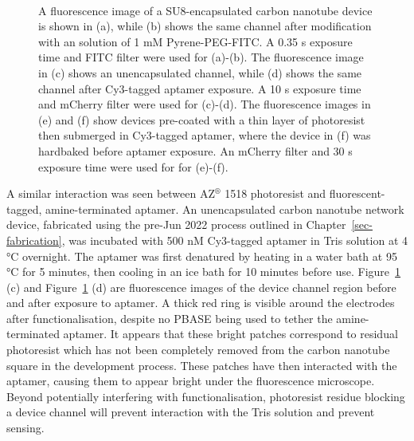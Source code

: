 \documentclass[
  a4paper,
]{scrbook}
\begin{document}
\begin{figure}
\begin{minipage}[t]{0.45\linewidth}
{{}

}

\end{minipage}%
%
\begin{minipage}[t]{0.01\linewidth}

{\centering 

~

}

\end{minipage}%

\caption[Fluorescence images demonstrating the interaction of
fluorescent-tagged linker or aptamer with photoresist present on a
carbon nanotube network device
surface.]{\label{fig-photoresist-contamination}A fluorescence image of a
SU8-encapsulated carbon nanotube device is shown in (a), while (b) shows
the same channel after modification with an solution of 1 mM
Pyrene-PEG-FITC. A 0.35 s exposure time and FITC filter were used for
(a)-(b). The fluorescence image in (c) shows an unencapsulated channel,
while (d) shows the same channel after Cy3-tagged aptamer exposure. A 10
s exposure time and mCherry filter were used for (c)-(d). The
fluorescence images in (e) and (f) show devices pre-coated with a thin
layer of photoresist then submerged in Cy3-tagged aptamer, where the
device in (f) was hardbaked before aptamer exposure. An mCherry filter
and 30 s exposure time were used for for (e)-(f).}

\end{figure}

A similar interaction was seen between AZ\(^\circledR\) 1518 photoresist
and fluorescent-tagged, amine-terminated aptamer. An unencapsulated
carbon nanotube network device, fabricated using the pre-Jun 2022
process outlined in Chapter~\ref{sec-fabrication}, was incubated with
500 nM Cy3-tagged aptamer in Tris solution at 4 °C overnight. The
aptamer was first denatured by heating in a water bath at 95 °C for 5
minutes, then cooling in an ice bath for 10 minutes before use.
Figure~\ref{fig-photoresist-contamination} (c) and
Figure~\ref{fig-photoresist-contamination} (d) are fluorescence images
of the device channel region before and after exposure to aptamer. A
thick red ring is visible around the electrodes after functionalisation,
despite no PBASE being used to tether the amine-terminated aptamer. It
appears that these bright patches correspond to residual photoresist
which has not been completely removed from the carbon nanotube square in
the development process. These patches have then interacted with the
aptamer, causing them to appear bright under the fluorescence
microscope. Beyond potentially interfering with functionalisation,
photoresist residue blocking a device channel will prevent interaction
with the Tris solution and prevent sensing.
\end{document}
